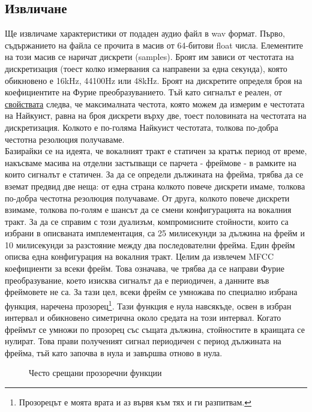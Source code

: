 \documentclass[main.tex]{subfiles}
\begin{document}
    \subsection{Извличане}
    Ще извличаме характеристики от подаден аудио файл в wav формат. Първо, съдържанието на файла се прочита в масив от 64-битови float числа. Елементите на този масив се наричат дискрети (samples). Броят им зависи от честотата на дискретизация (тоест колко измервания са направени за една секунда), която обикновено е 16kHz, 44100Hz или 48kHz. Броят на дискретите определя броя на коефициентите на Фурие преобразуванието. Тъй като сигналът е реален, от \hyperref[appendix:fourier:property]{свойствата} следва, че максималната честота, която можем да измерим е честотата на Найкуист, равна на броя дискрети върху две, тоест половината на честотата на дискретизация.
    Колкото е по-голяма Найкуист честотата, толкова по-добра честотна резолюция получаваме.\\
    Базирайки се на идеята, че вокалният тракт е статичен за кратък период от време, накъсваме масива на отделни застъпващи се парчета - фреймове - в рамките на които сигналът е статичен. За да се определи дължината на фрейма, трябва да се вземат предвид две неща: от една страна колкото повече дискрети имаме, толкова по-добра честотна резолюция получаваме. От друга, колкото повече дискрети взимаме, толкова по-голям е шансът да се смени конфигурацията на вокалния тракт. За да се справим с този дуализъм, компромисните стойности, които са избрани в описваната имплементация, са 25 милисекунди за дължина на фрейм и 10 милисекунди за разстояние между два последователни фрейма. Един фрейм описва една конфигурация на вокалния тракт.
    Целим да извлечем MFCC коефициенти за всеки фрейм. Това означава, че трябва да се направи Фурие преобразувание, което изисква сигналът да е периодичен, а данните във фреймовете не са. За тази цел, всеки фрейм се умножава по специално избрана функция, наречена прозорец\footnote{Прозорецът е моята врата и аз вървя към тях и ги разпитвам.}. Тази функция е нула навсякъде, освен в избран интервал и обикновено симетрична около средата на този интервал. Когато фреймът се умножи по прозорец със същата дължина, стойностите в краищата се нулират. Това прави полученият сигнал периодичен с период дължината на фрейма, тъй като започва в нула и завършва отново в нула.
    
    \begin{figure}[t]%
        \centering
            \hfill
            \vfill
        \caption{Често срещани прозоречни функции}%
        \label{fig:char:2}
    \end{figure}
\end{document}
